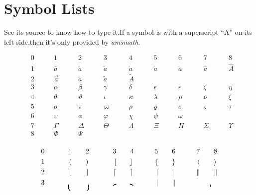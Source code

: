 \section{Symbol Lists}

\newcommand{\qqq}{\qquad&}

See its source to know how to type it.If a symbol is with a
superscript ``A'' on its left side,then it's only provided by
\emph{amsmath}.

\begin{displaymath}
\begin{aligned}
& 0 \qqq 1 \qqq 2 \qqq 3 \qqq 4 \qqq 5 \qqq 6 \qqq 7 \qqq 8\\
& 1 \qqq \bar{a} \qqq \acute{a} \qqq \check{a} \qqq \grave{a} \qqq
\dot{a} \qqq \ddot{a} \qqq \hat{a} \qqq \widehat{A}\\
& 2 \qqq \vec{a} \qqq \breve{a} \qqq \tilde{a} \qqq \widetilde{A}
\qqq \\
& 3 \qqq \alpha \qqq \beta \qqq \gamma \qqq \delta \qqq
\epsilon \qqq \varepsilon \qqq \zeta \qqq \eta\\
& 4 \qqq \theta \qqq \vartheta \qqq \iota \qqq \kappa \qqq
\lambda \qqq \mu \qqq \nu \qqq \xi \\
& 5 \qqq o \qqq \pi \qqq \varpi \qqq \rho \qqq \varrho \qqq \sigma
\qqq \varsigma \qqq \tau\\
& 6 \qqq \upsilon \qqq \phi \qqq \varphi \qqq \chi \qqq \psi \qqq
\omega \\
& 7 \qqq \Gamma \qqq \Delta \qqq \Theta \qqq \Lambda \qqq \Xi \qqq
\Pi \qqq \Sigma \qqq \Upsilon \\
& 8 \qqq \Phi \qqq \Psi \\
\end{aligned}
\end{displaymath}

\begin{displaymath}
\begin{aligned}
& 0 \qqq 1 \qqq 2 \qqq 3 \qqq 4 \qqq 5 \qqq 6 \qqq 7 \qqq 8\\
& 1 \qqq ( \qqq ) \qqq \lbrack \qqq \rbrack \qqq \lbrace \qqq
\rbrace \qqq \langle \qqq \rangle\\
& 2 \qqq \lfloor \qqq \rfloor \qqq \lceil \qqq \rceil \qqq \vert
\qqq | \qqq \Vert \qqq \|\\
& 3 \qqq \lgroup \qqq \rgroup \qqq \lmoustache \qqq \rmoustache \qqq
\arrowvert \qqq \Arrowvert \qqq \bracevert \\
\end{aligned}
\end{displaymath}

